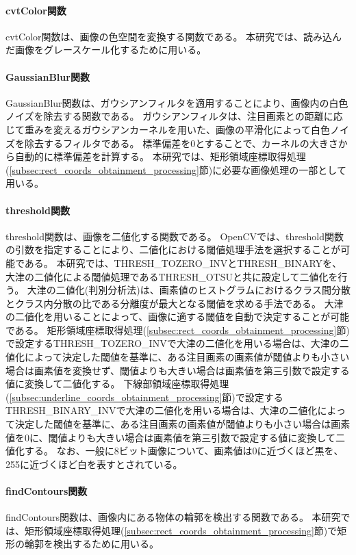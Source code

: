 \paragraph{cvtColor関数}
cvtColor関数は、画像の色空間を変換する関数である。
本研究では、読み込んだ画像をグレースケール化するために用いる。

\paragraph{GaussianBlur関数}
GaussianBlur関数は、ガウシアンフィルタを適用することにより、画像内の白色ノイズを除去する関数である。
ガウシアンフィルタは、注目画素との距離に応じて重みを変えるガウシアンカーネルを用いた、画像の平滑化によって白色ノイズを除去するフィルタである。
標準偏差を0とすることで、カーネルの大きさから自動的に標準偏差を計算する\cite{ガウシアンフィルタ}。
本研究では、矩形領域座標取得処理(\ref{subsec:rect_coords_obtainment_processing}節)に必要な画像処理の一部として用いる。

\paragraph{threshold関数}
threshold関数は、画像を二値化する関数である。
OpenCVでは、threshold関数の引数を指定することにより、二値化における閾値処理手法を選択することが可能である。
本研究では、THRESH\_TOZERO\_INVとTHRESH\_BINARYを、大津の二値化による閾値処理であるTHRESH\_OTSUと共に設定して二値化を行う。
大津の二値化(判別分析法)は、画素値のヒストグラムにおけるクラス間分散とクラス内分散の比である分離度が最大となる閾値を求める手法である\cite{大津の二値化}。
大津の二値化を用いることによって、画像に適する閾値を自動で決定することが可能である。
矩形領域座標取得処理(\ref{subsec:rect_coords_obtainment_processing}節)で設定するTHRESH\_TOZERO\_INVで大津の二値化を用いる場合は、大津の二値化によって決定した閾値を基準に、ある注目画素の画素値が閾値よりも小さい場合は画素値を変換せず、閾値よりも大きい場合は画素値を第三引数で設定する値に変換して二値化する。
下線部領域座標取得処理(\ref{subsec:underline_coords_obtainment_processing}節)で設定するTHRESH\_BINARY\_INVで大津の二値化を用いる場合は、大津の二値化によって決定した閾値を基準に、ある注目画素の画素値が閾値よりも小さい場合は画素値を0に、閾値よりも大きい場合は画素値を第三引数で設定する値に変換して二値化する。
なお、一般に8ビット画像について、画素値は0に近づくほど黒を、255に近づくほど白を表すとされている\cite{画素値}。

\paragraph{findContours関数}
findContours関数は、画像内にある物体の輪郭を検出する関数である。
本研究では、矩形領域座標取得処理(\ref{subsec:rect_coords_obtainment_processing}節)で矩形の輪郭を検出するために用いる。

